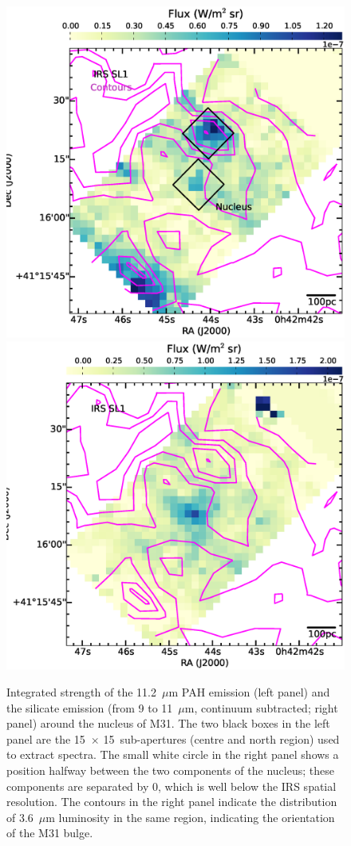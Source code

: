 \begin{figure}
\centering
\includegraphics[scale = 0.25]{./fig13a.eps}
\includegraphics[scale = 0.25]{./fig13b.eps}
\caption{
Integrated strength of the 11.2~$\mu$m PAH emission (left panel) and the silicate emission (from 9 to 11~$\mu$m, continuum subtracted; right panel) 
around the nucleus of M31. 
The  two black boxes in the left panel are the 15\arcsec\ $\times$ 15\arcsec\ sub-apertures (centre and north region) used to extract spectra.  
The small white circle in the right panel shows a position halfway between the two components of the nucleus; these
components are separated by 0, which is well below the IRS spatial resolution. The contours in the right panel indicate
the distribution of 3.6~$\mu$m luminosity in the same region, indicating the orientation of the M31 bulge.
}
\label{nuc11}
\end{figure}


